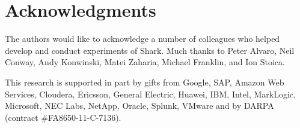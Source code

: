 \documentclass[preprint]{acm_proc_article-sp}
\begin{document}
\section{Acknowledgments}
The authors would like to acknowledge a number of colleagues who helped develop and conduct experiments of Shark. Much thanks to Peter Alvaro, Neil Conway, Andy Konwinski, Matei Zaharia, Michael Franklin, and Ion Stoica.

This research is supported in part by gifts from Google, SAP, Amazon Web Services, Cloudera, Ericsson, General Electric, Huawei, IBM, Intel, MarkLogic, Microsoft, NEC Labs, NetApp, Oracle, Splunk, VMware and by DARPA (contract \#FA8650-11-C-7136).




\balancecolumns
\end{document}
